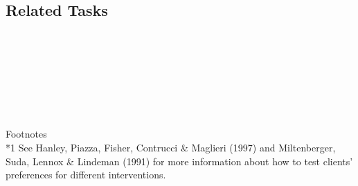 \subsection{Related Tasks}
\foureEight{}\\
\fouriSeven{}\\
\fourjTwo{}\\
\fourjFive{}\\
\fourjSix{}\\
\fourjSeven{}\\
\fourjEight{}\\
%
Footnotes\\
*1 See Hanley, Piazza, Fisher, Contrucci \& Maglieri (1997) and Miltenberger, Suda, Lennox \& Lindeman (1991) for more information about how to test clients' preferences for different interventions.\\
%
%
%
%
%
%
%
%
%
\section[\fourjFive{}]{\fourjFive{}%
              }
